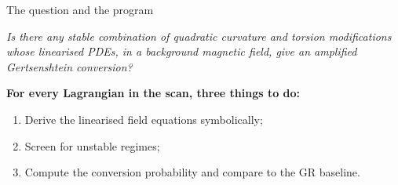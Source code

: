 \begin{frame}{The question and the program}
  \begin{block}{}
    \centering
    \emph{Is there any \emph{stable} combination of quadratic curvature and torsion modifications whose linearised PDEs, in a background magnetic field, give an amplified Gertsenshtein conversion?}
  \end{block}
  \vspace{0.6em}
  \textbf{For every Lagrangian in the scan, three things to do:}
  \begin{enumerate}
    \item Derive the linearised field equations symbolically;
    \item Screen for unstable regimes;
    \item Compute the conversion probability and compare to the GR baseline.
  \end{enumerate}
\end{frame}
